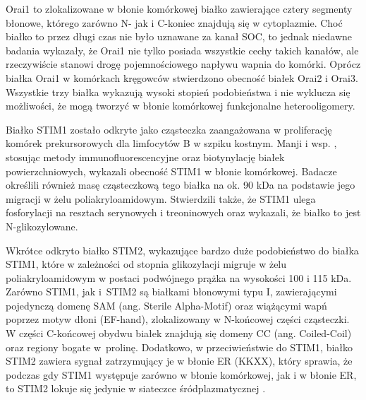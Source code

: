 Orai1 to zlokalizowane w błonie komórkowej białko zawierające cztery segmenty błonowe, którego zarówno N- jak i C-koniec znajdują się w cytoplazmie. Choć białko to przez długi czas nie było uznawane za kanał SOC, to jednak niedawne badania wykazały, że Orai1 nie tylko posiada wszystkie cechy takich kanałów, ale rzeczywiście stanowi drogę pojemnościowego napływu wapnia do komórki. Oprócz białka Orai1 w komórkach kręgowców stwierdzono obecność białek Orai2 i Orai3. Wszystkie trzy białka wykazują wysoki stopień podobieństwa i nie wyklucza się możliwości, że mogą tworzyć w błonie komórkowej funkcjonalne heterooligomery.

Białko STIM1 zostało odkryte jako cząsteczka zaangażowana w proliferację komórek prekursorowych dla limfocytów B w szpiku kostnym. Manji i wsp. \cite{Manji2000}, stosując metody immunofluorescencyjne oraz biotynylację białek powierzchniowych, wykazali obecność STIM1 w błonie komórkowej. Badacze określili również masę cząsteczkową tego białka na ok. 90 kDa na podstawie jego migracji w żelu poliakryloamidowym. Stwierdzili także, że STIM1 ulega fosforylacji na resztach serynowych i treoninowych oraz wykazali, że białko to jest N-glikozylowane.

Wkrótce odkryto białko STIM2, wykazujące bardzo duże podobieństwo do białka STIM1, które w zależności od stopnia glikozylacji migruje w żelu poliakryloamidowym w postaci podwójnego prążka na wysokości 100 i 115 kDa. Zarówno STIM1, jak i~STIM2 są białkami błonowymi typu I, zawierającymi pojedynczą domenę SAM (ang. Sterile Alpha-Motif) oraz wiążącymi wapń poprzez motyw dłoni (EF-hand), zlokalizowany w N-końcowej części cząsteczki. W części C-końcowej obydwu białek znajdują się domeny CC (ang. Coiled-Coil) oraz regiony bogate w~prolinę. Dodatkowo, w przeciwieństwie do STIM1, białko STIM2 zawiera sygnał zatrzymujący je w błonie ER (KKXX), który sprawia, że podczas gdy STIM1 występuje zarówno w błonie komórkowej, jak i w błonie ER, to STIM2 lokuje się jedynie w siateczce śródplazmatycznej \cite{Dziadek2007}.